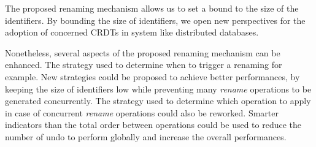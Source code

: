 \documentclass[sigplan]{acmart}
\begin{document}
The proposed renaming mechanism allows us to set a bound to the size of the identifiers.
By bounding the size of identifiers, we open new perspectives for the adoption of concerned \acp{CRDT} in system like distributed databases.

Nonetheless, several aspects of the proposed renaming mechanism can be enhanced.
The strategy used to determine when to trigger a renaming for example.
New strategies could be proposed to achieve better performances, by keeping the size of identifiers low while preventing many \emph{rename} operations to be generated concurrently.
The strategy used to determine which operation to apply in case of concurrent \emph{rename} operations could also be reworked. Smarter indicators than the total order between operations could be used to reduce the number of undo to perform globally and increase the overall performances.



\end{document}
